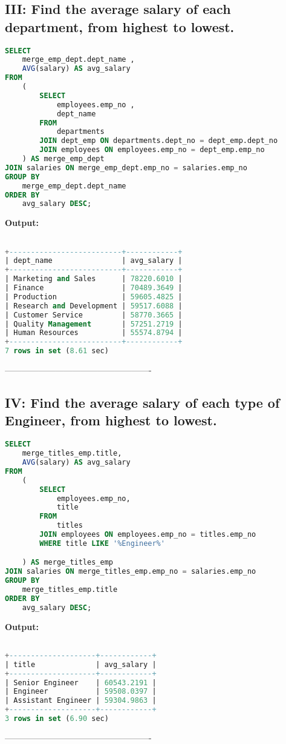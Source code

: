 \documentclass[12pt]{report}
\begin{document}
\subsection*{III: Find the average salary of each department, from highest to lowest.}

\begin{lstlisting}[language=sql]
SELECT
	merge_emp_dept.dept_name ,
	AVG(salary) AS avg_salary
FROM
	(
		SELECT
			employees.emp_no ,
			dept_name
		FROM
			departments
		JOIN dept_emp ON departments.dept_no = dept_emp.dept_no
		JOIN employees ON employees.emp_no = dept_emp.emp_no
	) AS merge_emp_dept
JOIN salaries ON merge_emp_dept.emp_no = salaries.emp_no
GROUP BY
	merge_emp_dept.dept_name
ORDER BY 
	avg_salary DESC;
\end{lstlisting}


\textbf{Output:}
\begin{lstlisting}[language=sql]

+--------------------------+------------+
| dept_name                | avg_salary |
+--------------------------+------------+
| Marketing and Sales      | 78220.6010 |
| Finance                  | 70489.3649 |
| Production               | 59605.4825 |
| Research and Development | 59517.6088 |
| Customer Service         | 58770.3665 |
| Quality Management       | 57251.2719 |
| Human Resources          | 55574.8794 |
+--------------------------+------------+
7 rows in set (8.61 sec)


\end{lstlisting}
----------------------------------------------------

\subsection*{IV: Find the average salary of each type of Engineer, from highest to lowest.}

\begin{lstlisting}[language=sql]
SELECT
	merge_titles_emp.title,
	AVG(salary) AS avg_salary
FROM
	(
		SELECT
			employees.emp_no,
			title
		FROM
			titles
		JOIN employees ON employees.emp_no = titles.emp_no 
		WHERE title LIKE '%Engineer%'

	) AS merge_titles_emp
JOIN salaries ON merge_titles_emp.emp_no = salaries.emp_no
GROUP BY
	merge_titles_emp.title
ORDER BY
	avg_salary DESC;
\end{lstlisting}


\textbf{Output:}

\begin{lstlisting}[language=sql]

+--------------------+------------+
| title              | avg_salary |
+--------------------+------------+
| Senior Engineer    | 60543.2191 |
| Engineer           | 59508.0397 |
| Assistant Engineer | 59304.9863 |
+--------------------+------------+
3 rows in set (6.90 sec)


\end{lstlisting}
----------------------------------------------------
\end{document}
